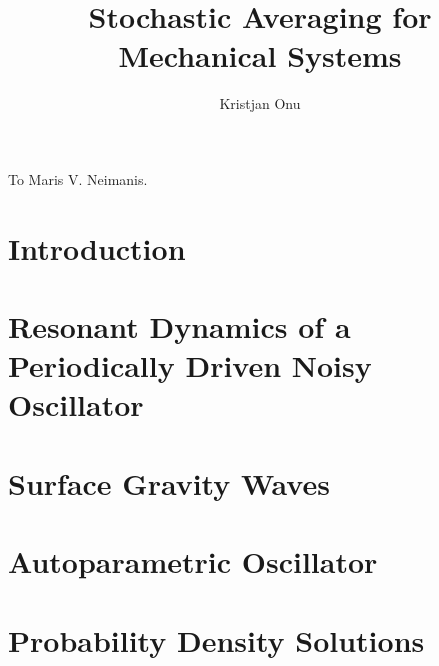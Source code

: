 \documentclass[letterpaper,tocnosub,noragright,centerchapter,12pt,edeposit]{uiucecethesis09}
\title{Stochastic Averaging for Mechanical Systems}
\author{Kristjan Onu}
\begin{document}
\maketitle

\frontmatter

\begin{abstract}

\end{abstract}

\begin{dedication}
To Maris V. Neimanis.
\end{dedication}

\begin{acknowledgments}

\end{acknowledgments}

\tableofcontents

\mainmatter

\chapter{Introduction}


\chapter{Resonant Dynamics of a Periodically Driven Noisy Oscillator}
\label{c:oscillator}


\chapter{Surface Gravity Waves}
\label{c:sgwaves}


\chapter{Autoparametric Oscillator}
\label{c:autoparametric}


\chapter{Probability Density Solutions}
\label{c:pdf}





\end{document}
